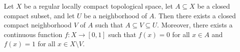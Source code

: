 Let $X$ be a regular locally compact topological space, let $A \subseteq X$ be a closed compact subset, and let $U$ be a neighborhood of $A$. Then there exists a closed compact neighborhood $V$ of $A$ such that $A \subseteq V \subseteq U$. Moreover, there exists a continuous function $f: X \to [0,1]$ such that $f(x) = 0$ for all $x \in A$ and $f(x) = 1$ for all $x \in X \setminus V$.
